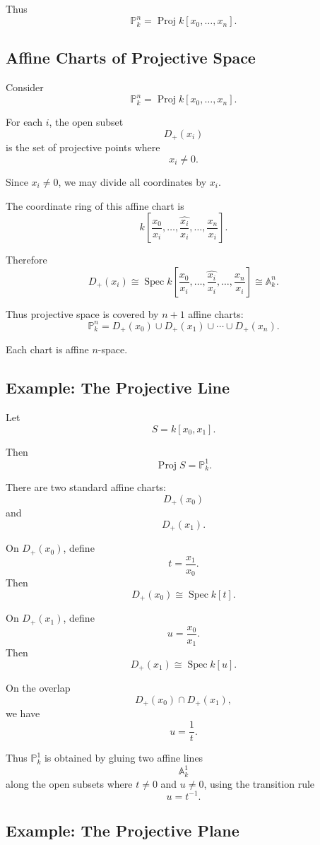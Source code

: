 \documentclass[12pt,a4paper]{article}
\DeclareMathOperator{\Spec}{Spec}
\DeclareMathOperator{\Proj}{Proj}
\theoremstyle{notespace}
\begin{document}
Thus
\[
\mathbb P_k^n
=
\Proj k[x_0,\dots,x_n].
\]

\subsection{Affine Charts of Projective Space}

Consider
\[
\mathbb P_k^n
=
\Proj k[x_0,\dots,x_n].
\]

For each \(i\), the open subset
\[
D_+(x_i)
\]
is the set of projective points where
\[
x_i\neq 0.
\]

Since \(x_i\neq 0\), we may divide all coordinates by \(x_i\).

The coordinate ring of this affine chart is
\[
k\left[
\frac{x_0}{x_i},
\dots,
\widehat{\frac{x_i}{x_i}},
\dots,
\frac{x_n}{x_i}
\right].
\]

Therefore
\[
D_+(x_i)
\cong
\Spec
k\left[
\frac{x_0}{x_i},
\dots,
\widehat{\frac{x_i}{x_i}},
\dots,
\frac{x_n}{x_i}
\right]
\cong
\mathbb A_k^n.
\]

Thus projective space is covered by \(n+1\) affine charts:
\[
\mathbb P_k^n
=
D_+(x_0)\cup D_+(x_1)\cup\cdots\cup D_+(x_n).
\]

Each chart is affine \(n\)-space.

\subsection{Example: The Projective Line}

Let
\[
S=k[x_0,x_1].
\]

Then
\[
\Proj S=\mathbb P_k^1.
\]

There are two standard affine charts:
\[
D_+(x_0)
\]
and
\[
D_+(x_1).
\]

On \(D_+(x_0)\), define
\[
t=\frac{x_1}{x_0}.
\]
Then
\[
D_+(x_0)\cong \Spec k[t].
\]

On \(D_+(x_1)\), define
\[
u=\frac{x_0}{x_1}.
\]
Then
\[
D_+(x_1)\cong \Spec k[u].
\]

On the overlap
\[
D_+(x_0)\cap D_+(x_1),
\]
we have
\[
u=\frac{1}{t}.
\]

Thus \(\mathbb P_k^1\) is obtained by gluing two affine lines
\[
\mathbb A_k^1
\]
along the open subsets where \(t\neq 0\) and \(u\neq 0\), using the transition rule
\[
u=t^{-1}.
\]

\subsection{Example: The Projective Plane}
\end{document}

